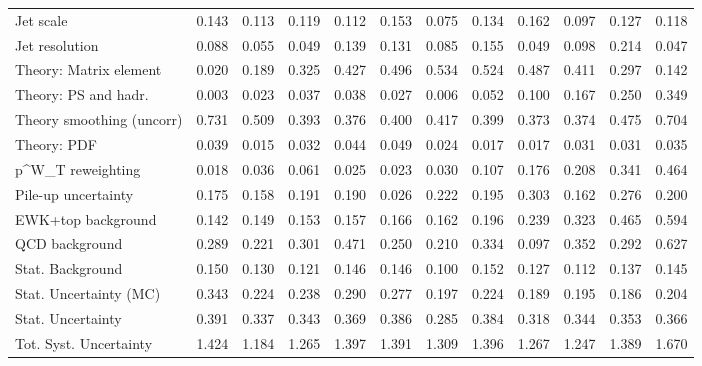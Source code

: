 \begin{tabular}{l|p{0.6cm}p{0.6cm}p{0.6cm}p{0.6cm}p{0.6cm}p{0.6cm}p{0.6cm}p{0.6cm}p{0.6cm}p{0.6cm}p{0.6cm}}
Jet scale                                & 0.143 & 0.113 & 0.119 & 0.112 & 0.153 & 0.075 & 0.134 & 0.162 & 0.097 & 0.127 & 0.118 \\
Jet resolution                           & 0.088 & 0.055 & 0.049 & 0.139 & 0.131 & 0.085 & 0.155 & 0.049 & 0.098 & 0.214 & 0.047 \\
Theory: Matrix element                   & 0.020 & 0.189 & 0.325 & 0.427 & 0.496 & 0.534 & 0.524 & 0.487 & 0.411 & 0.297 & 0.142 \\
Theory: PS and hadr.                     & 0.003 & 0.023 & 0.037 & 0.038 & 0.027 & 0.006 & 0.052 & 0.100 & 0.167 & 0.250 & 0.349 \\
Theory smoothing (uncorr)                & 0.731 & 0.509 & 0.393 & 0.376 & 0.400 & 0.417 & 0.399 & 0.373 & 0.374 & 0.475 & 0.704 \\
Theory: PDF                              & 0.039 & 0.015 & 0.032 & 0.044 & 0.049 & 0.024 & 0.017 & 0.017 & 0.031 & 0.031 & 0.035 \\
p^{W}_{T} reweighting                    & 0.018 & 0.036 & 0.061 & 0.025 & 0.023 & 0.030 & 0.107 & 0.176 & 0.208 & 0.341 & 0.464 \\
Pile-up uncertainty                      & 0.175 & 0.158 & 0.191 & 0.190 & 0.026 & 0.222 & 0.195 & 0.303 & 0.162 & 0.276 & 0.200 \\
EWK+top background                       & 0.142 & 0.149 & 0.153 & 0.157 & 0.166 & 0.162 & 0.196 & 0.239 & 0.323 & 0.465 & 0.594 \\
QCD background                           & 0.289 & 0.221 & 0.301 & 0.471 & 0.250 & 0.210 & 0.334 & 0.097 & 0.352 & 0.292 & 0.627 \\
Stat. Background                         & 0.150 & 0.130 & 0.121 & 0.146 & 0.146 & 0.100 & 0.152 & 0.127 & 0.112 & 0.137 & 0.145 \\
Stat. Uncertainty (MC)                   & 0.343 & 0.224 & 0.238 & 0.290 & 0.277 & 0.197 & 0.224 & 0.189 & 0.195 & 0.186 & 0.204 \\
\hline
Stat. Uncertainty                        & 0.391 & 0.337 & 0.343 & 0.369 & 0.386 & 0.285 & 0.384 & 0.318 & 0.344 & 0.353 & 0.366 \\
\hline
Tot. Syst. Uncertainty                   & 1.424 & 1.184 & 1.265 & 1.397 & 1.391 & 1.309 & 1.396 & 1.267 & 1.247 & 1.389 & 1.670 \\
\hline
\end{tabular}
